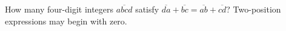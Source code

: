How many four-digit integers $\overline{abcd}$ satisfy $\overline{da}+\overline{bc}=\overline{ab}+\overline{cd}$? Two-position expressions may begin with zero.

